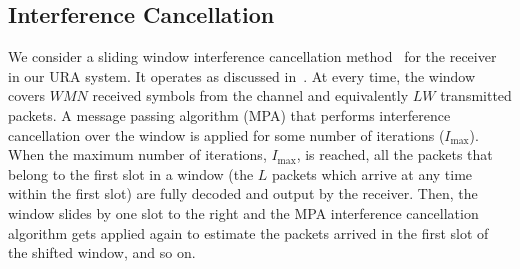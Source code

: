 \documentclass[journal,onecolumn,12pt]{IEEEtran}
\begin{document}
\subsection{Interference Cancellation}
\label{sec:IC}
We consider a sliding window interference cancellation method~\cite{KT18} for the receiver in our URA system. It operates as discussed in~\cite{TBKN20}. At every time, the window covers $WMN$ received symbols from the channel and equivalently $LW$ transmitted packets. A message passing algorithm (MPA) that performs interference cancellation over the window is applied for some number of iterations ($I_{\text{max}}$). When the maximum number of iterations, $I_{\text{max}}$, is reached, all the packets that belong to the first slot in a window (the $L$ packets which arrive at any time within the first slot) are fully decoded and output by the receiver. Then, the window slides by one slot to the right and the MPA interference cancellation algorithm gets applied again to estimate the packets arrived in the first slot of the shifted window, and so on.


\end{document}
